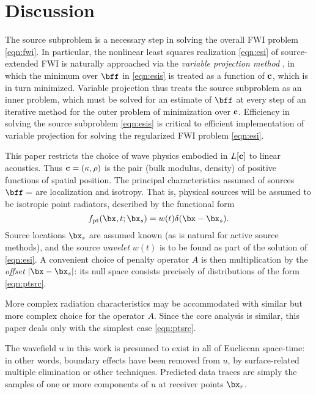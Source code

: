 \section{Discussion}

The source subproblem is a necessary step in solving the overall FWI problem \ref{eqn:fwi}. In particular, the nonlinear least squares realization \ref{eqn:esi} of source-extended FWI is naturally approached via the {\em variable projection method} \cite[]{GolubPereyra:73,GolubPereyra:03,vanLeeuwenMulder:09,Rickett:SEG12}, in which the minimum over $\bff$ in \ref{eqn:esis} is treated as a function of $\bf{c}$, which is in turn minimized. Variable projection thus treats the source subproblem as an inner problem, which must be solved for an estimate of $\bff$ at every step of an iterative method for the outer problem of minimization over $\bf{c}$. Efficiency in solving the source subproblem \ref{eqn:esis} is critical to efficient implementation of variable projection for solving the regularized FWI problem \ref{eqn:esi}.

This paper restricts the choice of wave physics embodied in
$L[\bf{c}]$ to linear acoustics.  Thus $\bf{c}=(\kappa,\rho)$ is the
pair (bulk modulus, density) of positive functions of spatial
position. The principal characteristics assumed of sources $\bff=$ are localization and isotropy. That is, physical sources will be assumed to be isotropic point radiators, described by the functional form
\begin{equation}
\label{eqn:ptsrc}
f_{\rm pt}(\bx,t;\bx_s) = w(t)\delta(\bx-\bx_s). 
\end{equation}
Source locations $\bx_s$ are assumed known (as is natural for active source methods), and the source {\em wavelet} $w(t)$ is to be found as part of the solution of \ref{eqn:esi}. A convenient choice of penalty operator $A$ is then multiplication by the {\em offset} $|\bx-\bx_s|$: its null space consists precisely of distributions of the form \ref{eqn:ptsrc}. 

More complex radiation characteristics may be accommodated with similar but more complex choice for the operator $A$. Since the core analysis is similar, this paper deals only with the simplest case \ref{eqn:ptsrc}.

The wavefield $u$ in this work is presumed to exist in all of Euclicean space-time: in other words, boundary effects have been removed from $u$, by surface-related multiple elimination or other techniques. Predicted data traces are simply the samples of one or more components of $u$ at receiver points $\bx_r$.

